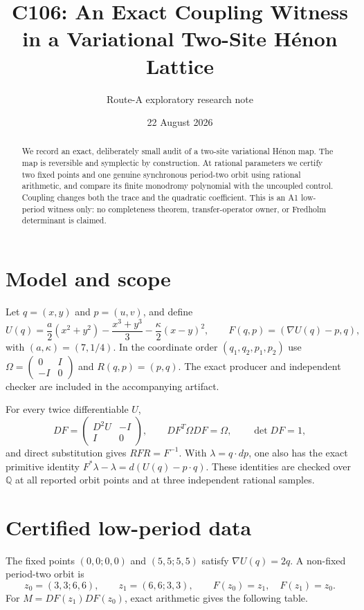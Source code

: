\documentclass[10pt]{article}
\title{C106: An Exact Coupling Witness in a Variational Two-Site H\'enon Lattice}
\author{Route-A exploratory research note}
\date{22 August 2026}
\newcommand{\Q}{\mathbb{Q}}
\begin{document}
\maketitle

\begin{abstract}
We record an exact, deliberately small audit of a two-site variational H\'enon map.  The map is reversible and symplectic by construction.  At rational parameters we certify two fixed points and one genuine synchronous period-two orbit using rational arithmetic, and compare its finite monodromy polynomial with the uncoupled control.  Coupling changes both the trace and the quadratic coefficient.  This is an A1 low-period witness only: no completeness theorem, transfer-operator owner, or Fredholm determinant is claimed.
\end{abstract}

\section{Model and scope}
Let $q=(x,y)$ and $p=(u,v)$, and define
\begin{equation}
 U(q)=\frac a2(x^2+y^2)-\frac{x^3+y^3}{3}-\frac{\kappa}{2}(x-y)^2,
 \qquad F(q,p)=(\nabla U(q)-p,q),
 \label{eq:model}
\end{equation}
with $(a,\kappa)=(7,1/4)$.  In the coordinate order $(q_1,q_2,p_1,p_2)$ use
$\Omega=\left(\begin{smallmatrix}0&I\\-I&0\end{smallmatrix}\right)$ and $R(q,p)=(p,q)$.
The exact producer and independent checker are included in the accompanying artifact.

For every twice differentiable $U$,
\[
 DF=\begin{pmatrix}D^2U&-I\\I&0\end{pmatrix},\qquad
 DF^T\Omega DF=\Omega,\qquad \det DF=1,
\]
and direct substitution gives $RFR=F^{-1}$.  With $\lambda=q\cdot dp$, one also has the exact primitive identity
$F^*\lambda-\lambda=d(U(q)-p\cdot q)$.  These identities are checked over $\Q$ at all reported orbit points and at three independent rational samples.

\section{Certified low-period data}
The fixed points $(0,0;0,0)$ and $(5,5;5,5)$ satisfy $\nabla U(q)=2q$.  A non-fixed period-two orbit is
\[
 z_0=(3,3;6,6),\qquad z_1=(6,6;3,3),\qquad F(z_0)=z_1,\quad F(z_1)=z_0.
\]
For $M=DF(z_1)DF(z_0)$, exact arithmetic gives the following table.
\end{document}
